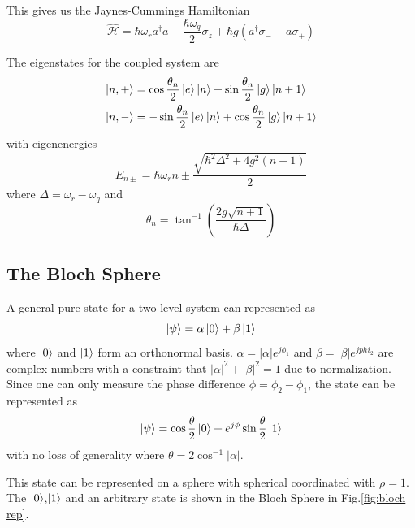 This gives us the Jaynes-Cummings Hamiltonian
\begin{equation}
\hat{\mathcal{H}}=\hbar\omega_ra^\dag a-\frac{\hbar\omega_q}{2}\sigma_z+\hbar g(a^\dag\sigma_-+a\sigma_+)
\end{equation}

The eigenstates for the coupled system are
\begin{subequations}
\label{eqn:coupled eigenstates}
\begin{align}
\ket{n,+} &= \cos\frac{\theta_n}{2}\ket{e}\ket{n}+\sin\frac{\theta_n}{2}\ket{g}\ket{n+1}\\
\ket{n,-} &= -\sin\frac{\theta_n}{2}\ket{e}\ket{n}+\cos\frac{\theta_n}{2}\ket{g}\ket{n+1}
\end{align}
\end{subequations}
with eigenenergies
\begin{equation}
E_{n\pm}=\hbar\omega_r n\pm\frac{\sqrt{\hbar^2\Delta^2+4g^2(n+1)}}{2}
\end{equation}
where $\Delta=\omega_r-\omega_q$ and
\begin{equation}
\theta_n = \tan^{-1}\left(\frac{2g\sqrt{n+1}}{\hbar \Delta}\right)
\end{equation}

\subsection{The Bloch Sphere}

A general pure state for a two level system can represented as
\begin{equation}
\ket{\psi} = \alpha\ket{0}+\beta\ket{1}
\end{equation}
where $\ket{0}$ and $\ket{1}$ form an orthonormal basis. $\alpha=|\alpha|e^{j\phi_1}$ and $\beta=|\beta|e^{jphi_2}$ are complex numbers with a constraint that $|\alpha|^2+|\beta|^2 = 1$ due to normalization. Since one can only measure the phase difference $\phi = \phi_2-\phi_1$, the state can be represented as
\begin{equation}
\ket{\psi} = \cos\frac{\theta}{2}\ket{0}+e^{j\phi}\sin\frac{\theta}{2}\ket{1}
\end{equation}
with no loss of generality where $\theta= 2\cos^{-1}|\alpha|$.

This state can be represented on a sphere with spherical coordinated with $\rho = 1$. The $\ket{0}$,$\ket{1}$ and an arbitrary state is shown in the Bloch Sphere in Fig.\ref{fig:bloch rep}.

